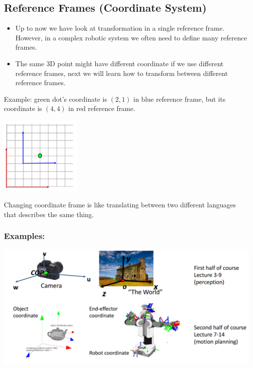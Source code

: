 \documentclass[10pt]{article}
\begin{document}
\subsection*{Reference Frames (Coordinate System)}
\begin{itemize}
	\item Up to now we have look at transformation in a single reference frame.  However, in a complex robotic system we often need to define many reference frames.
	\item The same 3D point might have different coordinate if we use different reference frames, next we will learn how to transform between different reference frames.
\end{itemize}
Example: green dot's coordinate is $(2, 1)$ in blue reference frame, but its coordinate is $(4, 4)$ in red reference frame.
\begin{center} 
	\includegraphics*[width=0.3\textwidth]{L1_8.png} 
\end{center}
Changing coordinate frame is like translating between two different languages that describes the same thing.

\subsubsection*{Examples:}
\begin{center} 
	\includegraphics*[width=\textwidth]{L1_9.png} 
\end{center}
\end{document}
